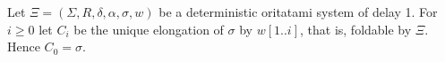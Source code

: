 Let $\Xi = (\Sigma, R, \delta, \alpha, \sigma, w)$ be a deterministic oritatami system of delay 1. 
For $i \geq 0$ let $C_i$ be the unique elongation of $\sigma$ by $w[1..i]$, that is, foldable by $\Xi$. Hence $C_0 = \sigma$.

\begin{comment}
\begin{figure}
  \begin{center}
    \begin{tikzpicture}
      \draw (0:0) circle [radius=0.05];
      \draw (0:1) circle [radius=0.05];
      \draw (180:1) circle [radius=0.05];
      \node[above] at (0:1) { $p^\prime$ };
      \node[above] at (0:0) { $p$ };
      \node[above] at (180:1) { $p^\prime$ };
      
      \fill (60 : 1) circle [radius=0.1];
      \fill (-60 : 1) circle [radius=0.1];
      \fill (120 : 1) circle [radius=0.1];
      \fill (-120 : 1) circle [radius=0.1];
      \node[above] at (60 :1) { $a_{j_1}$ };
      \node[above] at (-60 :1) { $a_{j_2}$ };
      \node[above] at (120 :1) { $a_{j_3}$ };
      \node[above] at (-120 :1) { $a_{j_4}$ };
      
      \begin{scope}[shift=(0:5)]
        \fill[blue] (0:0) circle [radius=0.1];
        \draw (0:1) circle [radius=0.05];
        \fill (180:1) circle [radius=0.1];
        \node[above] at (180:1.2) { $a_{i-2}$ };
        \node[above] at (0:0) { $a_{i-1}$ };
        \draw[->, blue] (180:0.9) -- (180:0.1);
        
        \fill (60 : 1) circle [radius=0.1];
        \fill (-60 : 1) circle [radius=0.1];
        \fill (120 : 1) circle [radius=0.1];
        \fill (-120 : 1) circle [radius=0.1];
        \node[above] at (60 :1) { $a_{j_1}$ };
        \node[above] at (-60 :1) { $a_{j_2}$ };
        \node[above] at (120 :1) { $a_{j_3}$ };
        \node[above] at (-120 :1) { $a_{j_4}$ };
      \end{scope}
      \begin{scope}[shift=(0:10)]
        \fill (0:0) circle [radius=0.1];
        \fill[blue] (0:1) circle [radius=0.1];
        \fill (180:1) circle [radius=0.1];
        \node[above] at (180:1) { $a_{i-2}$ };
        \node[above] at (0:0) { $a_{i-1}$ };
        \node[above] at (0:1) { $a_i$ };
        \draw[->] (180:0.9) -- (180:0.1);
        \draw[->,blue] (0:0.1) -- (0:0.9);
        
        \fill (60 : 1) circle [radius=0.1];
        \fill (-60 : 1) circle [radius=0.1];
        \fill (120 : 1) circle [radius=0.1];
        \fill (-120 : 1) circle [radius=0.1];
        \node[above] at (60 :1) { $a_{j_1}$ };
        \node[above] at (-60 :1) { $a_{j_2}$ };
        \node[above] at (120 :1) { $a_{j_3}$ };
        \node[above] at (-120 :1) { $a_{j_4}$ };
      \end{scope}
    \end{tikzpicture} 
    \caption{Through a tunnel section}
    \label{TTT_tunnel_intro}
  \end{center}
\end{figure}
\end{comment}

